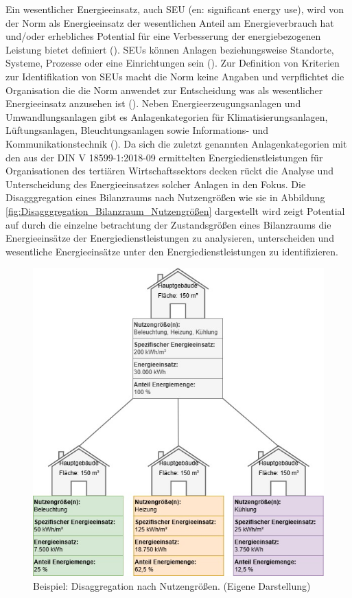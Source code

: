 Ein wesentlicher Energieeinsatz, auch SEU (en: significant energy use), wird von der Norm als Energieeinsatz der wesentlichen Anteil am Energieverbrauch 
hat und/oder erhebliches Potential für eine Verbesserung der energiebezogenen Leistung bietet definiert (\cite[Kapitel 3.5.6]{DIN50001.2018}). 
SEUs können Anlagen beziehungsweise Standorte, Systeme, Prozesse oder eine Einrichtungen sein (\cite[Kapitel 3.5.6]{DIN50001.2018}).
Zur Definition von Kriterien zur Identifikation von SEUs macht die Norm keine Angaben und verpflichtet die Organisation die die Norm anwendet zur Entscheidung was 
als wesentlicher Energieeinsatz anzusehen ist (\cite[S. 38]{DIN50001.2018}). 
Neben Energieerzeugungsanlagen und Umwandlungsanlagen gibt es Anlagenkategorien für Klimatisierungsanlagen, 
Lüftungsanlagen, Bleuchtungsanlagen sowie Informations- und Kommunikationstechnik (\cite[S. 14]{Hohnhold.2013}). 
Da sich die zuletzt genannten Anlagenkategorien mit den aus der DIN V 18599-1:2018-09 ermittelten Energiedienstleistungen für Organisationen des tertiären Wirtschaftssektors 
decken rückt die Analyse und Unterscheidung des Energieeinsatzes solcher Anlagen in den Fokus.
Die Disagggregation eines Bilanzraums nach Nutzengrößen wie sie in Abbildung \eqref{fig:Disagggregation_Bilanzraum_Nutzengrößen}  
dargestellt wird zeigt Potential auf durch die einzelne betrachtung der Zustandsgrößen eines Bilanzraums die Energieeinsätze der Energiedienstleistungen zu analysieren, 
unterscheiden und wesentliche Energieeinsätze unter den Energiedienstleistungen zu identifizieren. 

\begin{figure}[H]
    \centering
    \includegraphics[width=1\textwidth]{../../Ressourcen/Abbildungen/Nutzengröße_Bewertungseinheit_Zerlegt_Beispiel.jpg}
    \caption{Beispiel: Disaggregation nach Nutzengrößen. (Eigene Darstellung)}
    \label{fig:Disagggregation_Bilanzraum_Nutzengrößen_Beispiel}
\end{figure}

